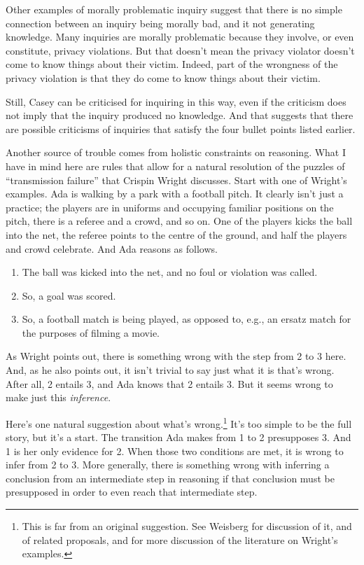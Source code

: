 \documentclass[
  11pt,
]{book}
\providecommand{\tightlist}{%
  \setlength{\itemsep}{0pt}\setlength{\parskip}{0pt}}
\begin{document}
Other examples of morally problematic inquiry suggest that there is no simple connection between an inquiry being morally bad, and it not generating knowledge. Many inquiries are morally problematic because they involve, or even constitute, privacy violations. But that doesn't mean the privacy violator doesn't come to know things about their victim. Indeed, part of the wrongness of the privacy violation is that they do come to know things about their victim.

Still, Casey can be criticised for inquiring in this way, even if the criticism does not imply that the inquiry produced no knowledge. And that suggests that there are possible criticisms of inquiries that satisfy the four bullet points listed earlier.

Another source of trouble comes from holistic constraints on reasoning. What I have in mind here are rules that allow for a natural resolution of the puzzles of ``transmission failure'' that Crispin Wright \citeyearpar{Wright2002} discusses. Start with one of Wright's examples. Ada is walking by a park with a football pitch. It clearly isn't just a practice; the players are in uniforms and occupying familiar positions on the pitch, there is a referee and a crowd, and so on. One of the players kicks the ball into the net, the referee points to the centre of the ground, and half the players and crowd celebrate. And Ada reasons as follows.

\begin{enumerate}
\def\labelenumi{\arabic{enumi}.}
\tightlist
\item
  The ball was kicked into the net, and no foul or violation was called.
\item
  So, a goal was scored.
\item
  So, a football match is being played, as opposed to, e.g., an ersatz match for the purposes of filming a movie.
\end{enumerate}

As Wright points out, there is something wrong with the step from 2 to 3 here. And, as he also points out, it isn't trivial to say just what it is that's wrong. After all, 2 entails 3, and Ada knows that 2 entails 3. But it seems wrong to make just this \emph{inference}.

Here's one natural suggestion about what's wrong.\footnote{This is far from an original suggestion. See Weisberg \citeyearpar{Weisberg2010} for discussion of it, and of related proposals, and for more discussion of the literature on Wright's examples.} It's too simple to be the full story, but it's a start. The transition Ada makes from 1 to 2 presupposes 3. And 1 is her only evidence for 2. When those two conditions are met, it is wrong to infer from 2 to 3. More generally, there is something wrong with inferring a conclusion from an intermediate step in reasoning if that conclusion must be presupposed in order to even reach that intermediate step.
\end{document}
